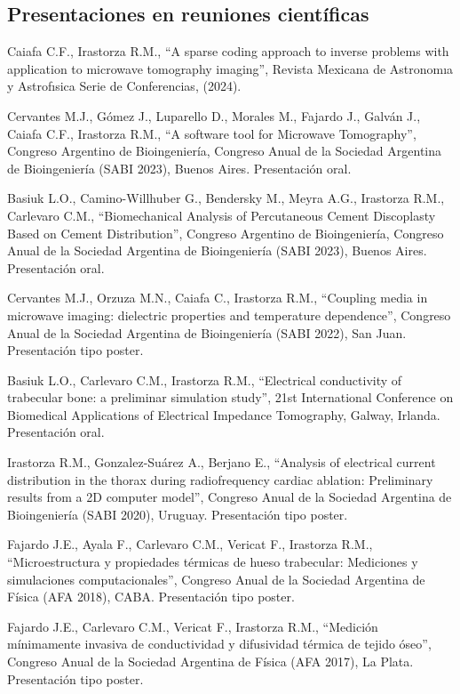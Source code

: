 \documentclass[margin,line]{res}
\begin{document}
\begin{resume}
\subsection{ Presentaciones en reuniones científicas}

Caiafa C.F., Irastorza R.M., ``A sparse coding approach to inverse problems with application to microwave tomography imaging'', Revista Mexicana de Astronomıa y Astrofısica Serie de Conferencias, (2024).

Cervantes M.J., Gómez J., Luparello D., Morales M., Fajardo J., Galván J., Caiafa C.F., Irastorza R.M., ``A software tool for Microwave Tomography'', Congreso Argentino de Bioingeniería,  Congreso Anual de la Sociedad Argentina de Bioingeniería (SABI 2023), Buenos Aires. Presentación oral.

Basiuk L.O., Camino-Willhuber G., Bendersky M., Meyra A.G., Irastorza R.M., Carlevaro C.M., ``Biomechanical Analysis of Percutaneous Cement Discoplasty Based on Cement Distribution'', Congreso Argentino de Bioingeniería,  Congreso Anual de la Sociedad Argentina de Bioingeniería (SABI 2023), Buenos Aires. Presentación oral.

Cervantes M.J., Orzuza M.N., Caiafa C., Irastorza R.M., ``Coupling media in microwave imaging: dielectric properties and temperature dependence'', Congreso Anual de la Sociedad Argentina de Bioingeniería (SABI 2022), San Juan. Presentación tipo poster.

Basiuk L.O., Carlevaro C.M., Irastorza R.M., ``Electrical conductivity of trabecular bone: a preliminar simulation study'', 21st International Conference on Biomedical Applications of Electrical Impedance Tomography, Galway, Irlanda. Presentación oral.

Irastorza R.M., Gonzalez-Suárez A., Berjano E., ``Analysis of electrical current distribution in the thorax during radiofrequency cardiac ablation: Preliminary results from a 2D computer model'', Congreso Anual de la Sociedad Argentina de Bioingeniería (SABI 2020), Uruguay. Presentación tipo poster.

Fajardo J.E., Ayala F., Carlevaro C.M., Vericat F., Irastorza R.M., ``Microestructura y propiedades térmicas de hueso trabecular: Mediciones y simulaciones computacionales'', Congreso Anual de la Sociedad Argentina de Física (AFA 2018), CABA. Presentación tipo poster.

Fajardo J.E., Carlevaro C.M., Vericat F., Irastorza R.M., ``Medición mínimamente invasiva de conductividad y difusividad térmica de tejido óseo'', Congreso Anual de la Sociedad Argentina de Física (AFA 2017), La Plata. Presentación tipo poster.


\end{resume}
\end{document}
